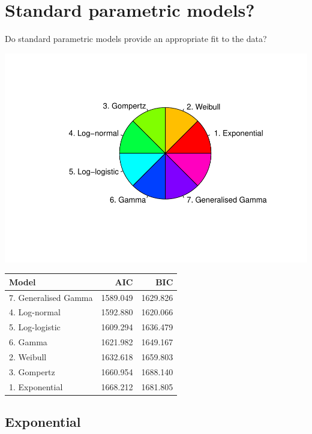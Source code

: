 \documentclass[]{article}
\begin{document}
\newpage

\section{Standard parametric models?}\label{standard-parametric-models}

Do standard parametric models provide an appropriate fit to the data?

\begin{flushleft}\includegraphics{images/plot_parametric-1} \end{flushleft}

\begin{table}[H]
\centering
\begin{tabular}{lrr}
\toprule
Model & AIC & BIC\\
\midrule
\rowcolor{gray!6}  7. Generalised Gamma & 1589.049 & 1629.826\\
4. Log-normal & 1592.880 & 1620.066\\
\rowcolor{gray!6}  5. Log-logistic & 1609.294 & 1636.479\\
6. Gamma & 1621.982 & 1649.167\\
\rowcolor{gray!6}  2. Weibull & 1632.618 & 1659.803\\
3. Gompertz & 1660.954 & 1688.140\\
\rowcolor{gray!6}  1. Exponential & 1668.212 & 1681.805\\
\bottomrule
\end{tabular}
\end{table}

\subsection{Exponential}\label{exponential}
\end{document}
